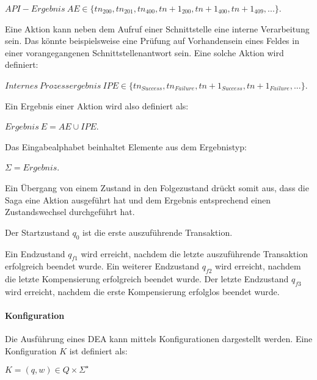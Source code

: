 \begin{center}
$API-Ergebnis\ AE \in \{tn_{200}, tn_{201}, tn_{400}, tn+1_{200}, tn+1_{400}, tn+1_{409}, ...\}$. 
\end{center}

Eine Aktion kann neben dem Aufruf einer Schnittstelle eine interne Verarbeitung sein. Das könnte beispielsweise eine Prüfung auf Vorhandensein eines Feldes in einer vorangegangenen Schnittstellenantwort sein. Eine solche Aktion wird definiert:

\begin{center}
$Internes\ Prozessergebnis\ IPE \in \{tn_{Success}, tn_{Failure}, tn+1_{Success}, tn+1_{Failure}, ...\}$.
\end{center}

Ein Ergebnis einer Aktion wird also definiert als:

\begin{center}
$Ergebnis\ E = AE \cup IPE$.
\end{center}

Das Eingabealphabet beinhaltet Elemente aus dem Ergebnistyp: 

\begin{center}
$\Sigma = Ergebnis$.
\end{center}

Ein Übergang von einem Zustand in den Folgezustand drückt somit aus, dass die Saga eine Aktion ausgeführt hat und dem Ergebnis entsprechend einen Zustandswechsel durchgeführt hat. 

Der Startzustand $q_0$ ist die erste auszuführende Transaktion. 

Ein Endzustand $q_{f1}$ wird erreicht, nachdem die letzte auszuführende Transaktion erfolgreich beendet wurde. Ein weiterer Endzustand $q_{f2}$ wird erreicht, nachdem die letzte Kompensierung erfolgreich beendet wurde. Der letzte Endzustand $q_{f3}$ wird erreicht, nachdem die erste Kompensierung erfolglos beendet wurde.

\paragraph{Konfiguration}%
Die Ausführung eines DEA kann mittels Konfigurationen dargestellt werden. Eine Konfiguration $K$ ist definiert als: 

\begin{center}
$K = (q, w) \in Q \times \Sigma^{\star}$
\end{center}

